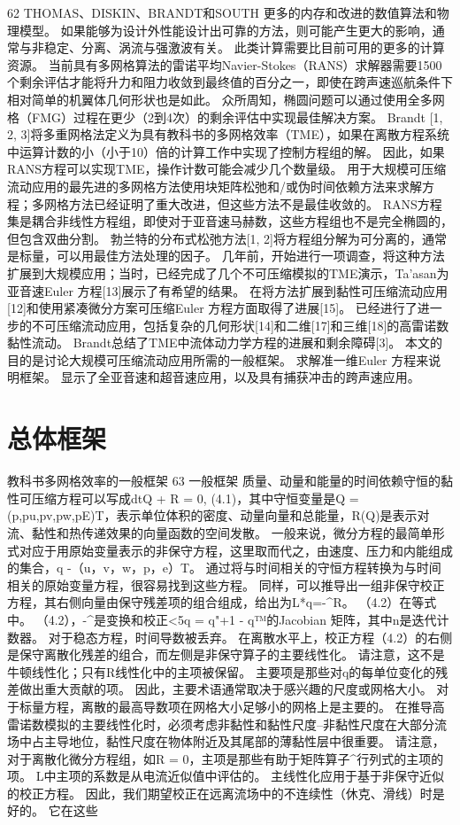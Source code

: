 \documentclass[UTF8,11pt,a4paper,openany,fontset=fandol]{ctexbook}
\begin{document}
62 THOMAS、DISKIN、BRANDT和SOUTH 更多的内存和改进的数值算法和物理模型。 如果能够为设计外性能设计出可靠的方法，则可能产生更大的影响，通常与非稳定、分离、涡流与强激波有关。 此类计算需要比目前可用的更多的计算资源。 当前具有多网格算法的雷诺平均Navier-Stokes（RANS）求解器需要1500个剩余评估才能将升力和阻力收敛到最终值的百分之一，即使在跨声速巡航条件下相对简单的机翼体几何形状也是如此。 众所周知，椭圆问题可以通过使用全多网格（FMG）过程在更少（2到4次）的剩余评估中实现最佳解决方案。 Brandt [1, 2, 3]将多重网格法定义为具有教科书的多网格效率（TME），如果在离散方程系统中运算计数的小（小于10）倍的计算工作中实现了控制方程组的解。 因此，如果RANS方程可以实现TME，操作计数可能会减少几个数量级。 用于大规模可压缩流动应用的最先进的多网格方法使用块矩阵松弛和/或伪时间依赖方法来求解方程；多网格方法已经证明了重大改进，但这些方法不是最佳收敛的。 RANS方程集是耦合非线性方程组，即使对于亚音速马赫数，这些方程组也不是完全椭圆的，但包含双曲分割。 勃兰特的分布式松弛方法[1, 2]将方程组分解为可分离的，通常是标量，可以用最佳方法处理的因子。 几年前，开始进行一项调查，将这种方法扩展到大规模应用；当时，已经完成了几个不可压缩模拟的TME演示，Ta'asan为亚音速Euler 方程[13]展示了有希望的结果。 在将方法扩展到黏性可压缩流动应用[12]和使用紧凑微分方案可压缩Euler 方程方面取得了进展[15]。 已经进行了进一步的不可压缩流动应用，包括复杂的几何形状[14]和二维[17]和三维[18]的高雷诺数黏性流动。 Brandt总结了TME中流体动力学方程的进展和剩余障碍[3]。 本文的目的是讨论大规模可压缩流动应用所需的一般框架。 求解准一维Euler 方程来说明框架。 显示了全亚音速和超音速应用，以及具有捕获冲击的跨声速应用。

\section{总体框架}
教科书多网格效率的一般框架 63 一般框架 质量、动量和能量的时间依赖守恒的黏性可压缩方程可以写成dtQ + R = 0, (4.1)，其中守恒变量是Q = (p,pu,pv,pw,pE)T，表示单位体积的密度、动量向量和总能量，R(Q)是表示对流、黏性和热传递效果的向量函数的空间发散。 一般来说，微分方程的最简单形式对应于用原始变量表示的非保守方程，这里取而代之，由速度、压力和内能组成的集合，q -（u，v，w，p，e）T。 通过将与时间相关的守恒方程转换为与时间相关的原始变量方程，很容易找到这些方程。 同样，可以推导出一组非保守校正方程，其右侧向量由保守残差项的组合组成，给出为L*q=-\textasciicircum{}R。 （4.2）在等式中。 （4.2），-\textasciicircum{}是变换和校正<5q = q"+1 - q™的Jacobian 矩阵，其中n是迭代计数器。 对于稳态方程，时间导数被丢弃。 在离散水平上，校正方程（4.2）的右侧是保守离散化残差的组合，而左侧是非保守算子的主要线性化。 请注意，这不是牛顿线性化；只有R线性化中的主项被保留。 主要项是那些对q的每单位变化的残差做出重大贡献的项。 因此，主要术语通常取决于感兴趣的尺度或网格大小。 对于标量方程，离散的最高导数项在网格大小足够小的网格上是主要的。 在推导高雷诺数模拟的主要线性化时，必须考虑非黏性和黏性尺度--非黏性尺度在大部分流场中占主导地位，黏性尺度在物体附近及其尾部的薄黏性层中很重要。 请注意，对于离散化微分方程组，如R = 0，主项是那些有助于矩阵算子\textasciicircum{}行列式的主项的项。 L中主项的系数是从电流近似值中评估的。 主线性化应用于基于非保守近似的校正方程。 因此，我们期望校正在远离流场中的不连续性（休克、滑线）时是好的。 它在这些
\end{document}
